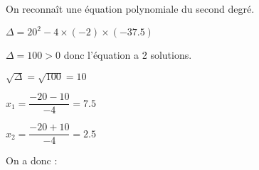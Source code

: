 \documentclass[a4paper,12pt]{scrartcl}
\begin{document}
On reconnaît une équation polynomiale du second degré. 

$\Delta = 20^2-4 \times (-2) \times (-37.5)$

$\Delta = 100 > 0$ donc l'équation a 2 solutions.

$\sqrt{\Delta} = \sqrt{100} = 10$

$x_1 = \dfrac{-20 - 10}{-4} = 7.5$

$x_2 = \dfrac{-20 + 10}{-4} = 2.5$

On a donc : 


%
%
%
%
%
%
%
%
%
%
%
%
%
\end{document}

